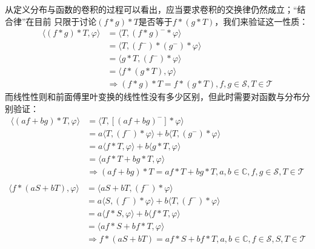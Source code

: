 \documentclass{ctexbook}
\begin{document}
从定义分布与函数的卷积的过程可以看出，应当要求卷积的交换律仍然成立；“结合律”在目前
只限于讨论$(f*g)*T$是否等于$f*(g*T)$，我们来验证这一性质：
\begin{align*}
    \langle (f*g)*T,\varphi\rangle & =\langle T,(f*g)^- *\varphi\rangle                             \\
                                   & =\langle T,(f^-)*(g^-)*\varphi\rangle                          \\
                                   & =\langle g*T,(f^-)*\varphi\rangle                              \\
                                   & =\langle f*(g*T),\varphi\rangle                                \\
                                   & \Rightarrow (f*g)*T=f*(g*T),f,g\in\mathcal{S} ,T\in\mathcal{T}
\end{align*}
而线性性则和前面傅里叶变换的线性性没有多少区别，但此时需要对函数与分布分别验证：
\begin{align*}
    \langle (af+bg)*T,\varphi\rangle & =\langle T,[(af+bg)^-]*\varphi\rangle                                               \\
                                     & =a\langle T,(f^-)*\varphi\rangle+b\langle T,(g^-)*\varphi\rangle                    \\
                                     & =a\langle f*T,\varphi\rangle+b\langle g*T,\varphi\rangle                            \\
                                     & =\langle af*T+bg*T,\varphi\rangle                                                   \\
                                     & \Rightarrow (af+bg)*T=af*T+bg*T,a,b\in\mathbb{C},f,g\in\mathcal{S} ,T\in\mathcal{T} \\
\end{align*}
\begin{align*}
    \langle f*(aS+bT),\varphi\rangle & =\langle aS+bT,(f^-)*\varphi\rangle                                                 \\
                                     & =a\langle S,(f^-)*\varphi\rangle+b\langle T,(f^-)*\varphi\rangle                    \\
                                     & =a\langle f*S,\varphi\rangle+b\langle f*T,\varphi\rangle                            \\
                                     & =\langle af*S+bf*T,\varphi\rangle                                                   \\
                                     & \Rightarrow f*(aS+bT)=af*S+bf*T,a,b\in\mathbb{C},f\in\mathcal{S} ,S,T\in\mathcal{T}
\end{align*}
\end{document}
